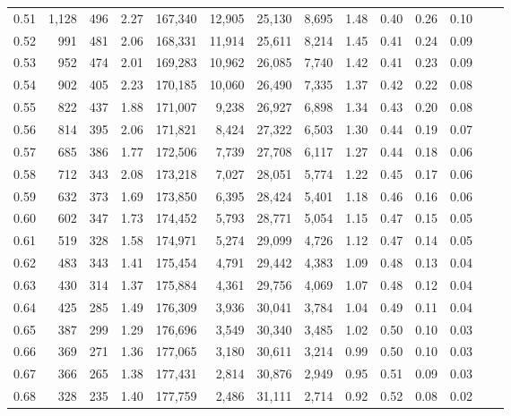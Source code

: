 \begin{tabular}{rrrrrrrrrrrrrr}
0.51 &  1,128 &  496 &    2.27 &  167,340 &   12,905 &  25,130 &   8,695 &  1.48 &  0.40 &  0.26 &      0.10 \\
0.52 &    991 &  481 &    2.06 &  168,331 &   11,914 &  25,611 &   8,214 &  1.45 &  0.41 &  0.24 &      0.09 \\
0.53 &    952 &  474 &    2.01 &  169,283 &   10,962 &  26,085 &   7,740 &  1.42 &  0.41 &  0.23 &      0.09 \\
0.54 &    902 &  405 &    2.23 &  170,185 &   10,060 &  26,490 &   7,335 &  1.37 &  0.42 &  0.22 &      0.08 \\
0.55 &    822 &  437 &    1.88 &  171,007 &    9,238 &  26,927 &   6,898 &  1.34 &  0.43 &  0.20 &      0.08 \\
0.56 &    814 &  395 &    2.06 &  171,821 &    8,424 &  27,322 &   6,503 &  1.30 &  0.44 &  0.19 &      0.07 \\
0.57 &    685 &  386 &    1.77 &  172,506 &    7,739 &  27,708 &   6,117 &  1.27 &  0.44 &  0.18 &      0.06 \\
0.58 &    712 &  343 &    2.08 &  173,218 &    7,027 &  28,051 &   5,774 &  1.22 &  0.45 &  0.17 &      0.06 \\
0.59 &    632 &  373 &    1.69 &  173,850 &    6,395 &  28,424 &   5,401 &  1.18 &  0.46 &  0.16 &      0.06 \\
0.60 &    602 &  347 &    1.73 &  174,452 &    5,793 &  28,771 &   5,054 &  1.15 &  0.47 &  0.15 &      0.05 \\
0.61 &    519 &  328 &    1.58 &  174,971 &    5,274 &  29,099 &   4,726 &  1.12 &  0.47 &  0.14 &      0.05 \\
0.62 &    483 &  343 &    1.41 &  175,454 &    4,791 &  29,442 &   4,383 &  1.09 &  0.48 &  0.13 &      0.04 \\
0.63 &    430 &  314 &    1.37 &  175,884 &    4,361 &  29,756 &   4,069 &  1.07 &  0.48 &  0.12 &      0.04 \\
0.64 &    425 &  285 &    1.49 &  176,309 &    3,936 &  30,041 &   3,784 &  1.04 &  0.49 &  0.11 &      0.04 \\
0.65 &    387 &  299 &    1.29 &  176,696 &    3,549 &  30,340 &   3,485 &  1.02 &  0.50 &  0.10 &      0.03 \\
0.66 &    369 &  271 &    1.36 &  177,065 &    3,180 &  30,611 &   3,214 &  0.99 &  0.50 &  0.10 &      0.03 \\
0.67 &    366 &  265 &    1.38 &  177,431 &    2,814 &  30,876 &   2,949 &  0.95 &  0.51 &  0.09 &      0.03 \\
0.68 &    328 &  235 &    1.40 &  177,759 &    2,486 &  31,111 &   2,714 &  0.92 &  0.52 &  0.08 &      0.02 \\

\end{tabular}
